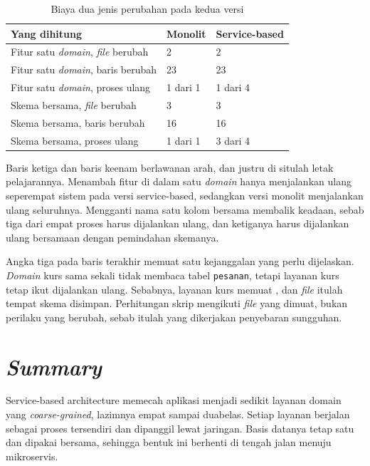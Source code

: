 \begin{table}[htbp]
  \centering
  \caption{Biaya dua jenis perubahan pada kedua versi}
  \label{tab:biaya}
  \begin{tabularx}{\textwidth}{|X|l|l|}
    \hline
    \textbf{Yang dihitung} & \textbf{Monolit} & \textbf{Service-based} \\
    \hline
    Fitur satu \textit{domain}, \textit{file} berubah & 2 & 2 \\
    \hline
    Fitur satu \textit{domain}, baris berubah & 23 & 23 \\
    \hline
    Fitur satu \textit{domain}, proses ulang & 1 dari 1 & 1 dari 4 \\
    \hline
    Skema bersama, \textit{file} berubah & 3 & 3 \\
    \hline
    Skema bersama, baris berubah & 16 & 16 \\
    \hline
    Skema bersama, proses ulang & 1 dari 1 & 3 dari 4 \\
    \hline
  \end{tabularx}
\end{table}

Baris ketiga dan baris keenam berlawanan arah, dan justru di situlah letak
pelajarannya. Menambah fitur di dalam satu \textit{domain} hanya menjalankan ulang
seperempat sistem pada versi service-based, sedangkan versi monolit
menjalankan ulang seluruhnya. Mengganti nama satu kolom bersama membalik
keadaan, sebab tiga dari empat proses harus dijalankan ulang, dan ketiganya
harus dijalankan ulang bersamaan dengan pemindahan skemanya.

Angka tiga pada baris terakhir memuat satu kejanggalan yang perlu dijelaskan.
\textit{Domain} kurs sama sekali tidak membaca tabel \texttt{pesanan}, tetapi layanan kurs tetap
ikut dijalankan ulang. Sebabnya, layanan kurs memuat
, dan \textit{file} itulah tempat skema
disimpan. Perhitungan skrip mengikuti \textit{file} yang dimuat, bukan perilaku yang
berubah, sebab itulah yang dikerjakan penyebaran sungguhan.

\section{\textit{Summary}}

Service-based architecture memecah aplikasi menjadi sedikit layanan domain
yang \textit{coarse-grained}, lazimnya empat sampai duabelas. Setiap layanan berjalan
sebagai proses tersendiri dan dipanggil lewat jaringan. Basis datanya tetap
satu dan dipakai bersama, sehingga bentuk ini berhenti di tengah jalan menuju
mikroservis.

